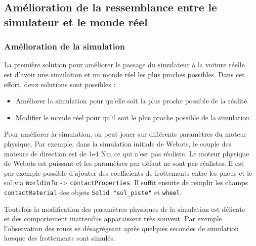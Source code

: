 \documentclass[french]{article}
\begin{document}
\subsection{Amélioration de la ressemblance entre le simulateur et le monde réel}

\subsubsection{Amélioration de la simulation}

La première solution pour améliorer le passage du simulateur à la voiture réelle est d'avoir une simulation et un monde réel les plus proches possibles. Dans cet effort, deux solutions sont possibles :
\begin{itemize}
    \item Améliorer la simulation pour qu'elle soit la plus proche possible de la réalité.
    \item Modifier le monde réel pour qu'il soit le plus proche possible de la simulation.
\end{itemize}

\vspace{0.5cm}
Pour améliorer la simulation, on peut jouer sur différents paramètres du moteur physique. Par exemple, dans la simulation initiale de Webots, le couple des moteurs de direction est de 1e4 Nm ce qui n'est pas réaliste.
Le moteur physique de Webots est puissant et les paramètres par défaut ne sont pas réalistes.
Il est par exemple possible d'ajouter des coefficients de frottements entre les pneus et le sol via \verb|WorldInfo| -> \verb|contactProperties|. Il suffit ensuite de remplir les champs \verb|contactMaterial| des objets \verb|Solid "sol_piste"| et \verb|wheel|.
\vspace*{0.5cm}

Toutefois la modification des paramètres physiques de la simulation est délicate et des comportement inattendus apparaissent très souvent. Par exemple l'observation des roues se désagrégeant après quelques secondes de simulation lorsque des frottements sont simulés.
\vspace*{0.5cm}
\end{document}
